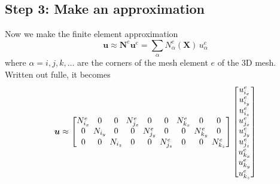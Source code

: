 \documentclass[acmtog]{acmart}
\begin{document}
\subsection{Step 3: Make an approximation}
Now we make the finite element approximation
%
\begin{equation}
  \boldsymbol u \approx \boldsymbol N^e \boldsymbol u^e = \sum_\alpha N_\alpha^e(\boldsymbol X) \,u_\alpha^e
\end{equation}
%
where $\alpha = i,j,k,\dots$ are the corners of the mesh element $e$ of
the 3D mesh. Written out fulle, it becomes
%
\begin{align}
  \boldsymbol u \approx
  \begin{bmatrix}
    N_{i_x}^e \hspace{-6pt}& 0       \hspace{-6pt}& 0       \hspace{-6pt}& N_{j_x}^e \hspace{-6pt}& 0         \hspace{-6pt}& 0         \hspace{-6pt}& N_{k_x}^e \hspace{-6pt}& 0         \hspace{-6pt}& 0         \\
    0         \hspace{-6pt}& N_{i_y} \hspace{-6pt}& 0       \hspace{-6pt}& 0         \hspace{-6pt}& N_{j_y}^e \hspace{-6pt}& 0         \hspace{-6pt}& 0         \hspace{-6pt}& N_{k_y}^e \hspace{-6pt}& 0         \\
    0         \hspace{-6pt}& 0       \hspace{-6pt}& N_{i_z} \hspace{-6pt}& 0         \hspace{-6pt}& 0         \hspace{-6pt}& N_{j_z}^e \hspace{-6pt}& 0         \hspace{-6pt}& 0         \hspace{-6pt}& N_{k_z}^e
  \end{bmatrix}
  \begin{bmatrix}
    u_{i_x}^e \\
    u_{i_y}^e \\
    u_{i_z}^e \\
    u_{j_x}^e \\
    u_{j_y}^e \\
    u_{j_z}^e \\
    u_{k_x}^e \\
    u_{k_y}^e \\
    u_{k_z}^e
  \end{bmatrix}
\end{align}
%
\end{document}
